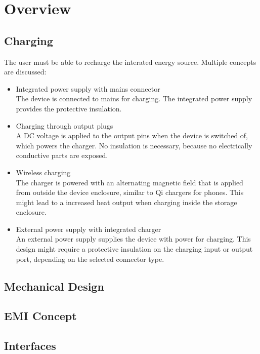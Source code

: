 \section{Overview}
\label{sec:overview}

\subsection{Charging}
The user must be able to recharge the interated energy source. Multiple concepts are discussed: 

\begin{itemize}
    \item Integrated power supply with mains connector
        \\
        The device is connected to mains for charging. The integrated power supply provides the protective insulation. 
    \item Charging through output plugs
        \\
        A DC voltage is applied to the output pins when the device is switched of, which powers the charger. No insulation is necessary, because no electrically conductive parts are exposed. 
    \item Wireless charging
        \\
        The charger is powered with an alternating magnetic field that is applied from outside the device enclosure, similar to Qi chargers for phones. This might lead to a increased heat output when charging inside the storage enclosure. 
    \item External power supply with integrated charger
        \\
        An external power supply supplies the device with power for charging. This design might require a protective insulation on the charging input or output port, depending on the selected connector type. 
\end{itemize}

\subsection{Mechanical Design}

\FloatBarrier
\subsection{EMI Concept}

\FloatBarrier
\subsection{Interfaces}

